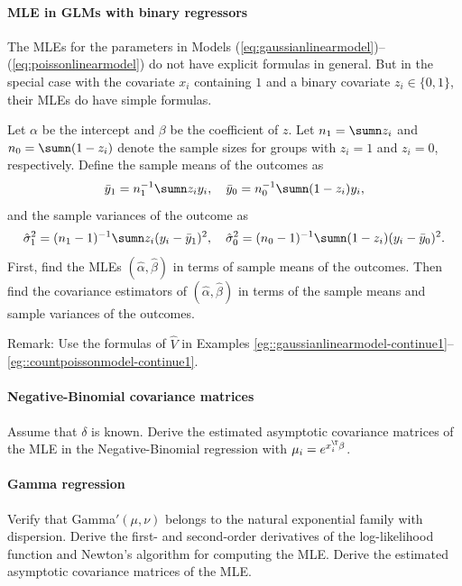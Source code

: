  

\paragraph{MLE in GLMs with binary regressors}\label{hw20::mle-binary-z}

The MLEs for the parameters in Models (\ref{eq:gaussianlinearmodel})--(\ref{eq:poissonlinearmodel}) do not have explicit formulas in general. But in the special case with the covariate $x_{i}$ containing $1$ and a binary covariate $z_i \in \{0, 1\}$, their MLEs do have simple formulas. 


Let $\alpha$ be the intercept and $\beta$ be the coefficient of $z$.  
Let $n_1 = \sumn z_i$ and $n_0=\sumn (1-z_i) $ denote the sample sizes for groups with $z_i=1$ and $z_i=0$, respectively. 
Define the sample means of the outcomes as 
$$
\bar{y}_1 = n_1^{-1} \sumn z_i y_i, \quad 
\bar{y}_0 = n_0^{-1}  \sumn (1-z_i) y_i ,
$$
and the sample variances of the outcome as 
$$
\hat{\sigma}_1^2 = (n_1-1)^{-1} \sumn z_i (y_i  - \bar{y}_1)^2 ,\quad 
\hat{\sigma}_0^2 = (n_0-1)^{-1} \sumn (1-z_i) (y_i  - \bar{y}_0)^2 .
$$
First,  find the MLEs $(\hat{\alpha}, \hat{\beta})$ in terms of sample means of the outcomes.
Then find the covariance estimators of $(\hat{\alpha}, \hat{\beta})$ in terms of the sample means and sample variances of the outcomes.


Remark: Use the formulas of $\hat{V}$ in Examples \ref{eg::gaussianlinearmodel-continue1}--\ref{eg::countpoissonmodel-continue1}. 



 
\paragraph{Negative-Binomial covariance matrices}\label{hw20::nb-sandwich}

Assume that $\delta$ is known. 
Derive the estimated asymptotic covariance matrices of the MLE in the Negative-Binomial regression with $\mu_i = e^{x_i^{\T} \beta}$.



\paragraph{Gamma regression}
 

Verify that Gamma$'(\mu, \nu)$ belongs to the natural exponential family with dispersion. Derive the first- and second-order derivatives of the log-likelihood function and Newton's algorithm for computing the MLE. 
Derive the estimated asymptotic covariance matrices of the MLE. 


